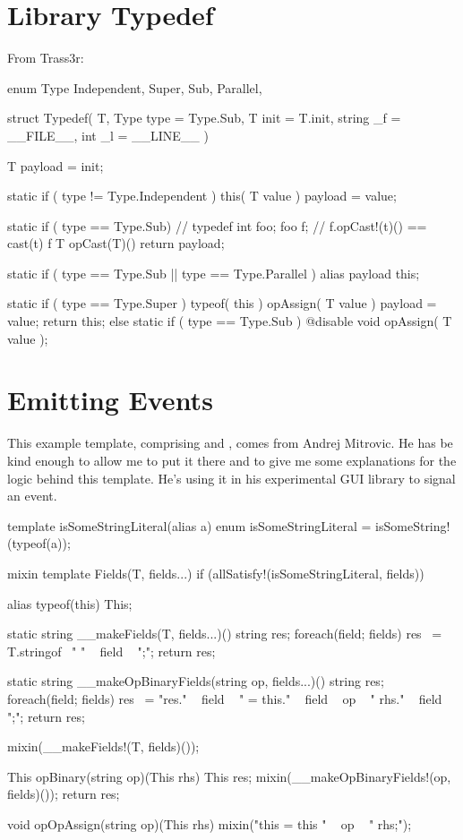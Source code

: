 \section{Library Typedef}

From Trass3r:

\begin{dcode}
enum Type
{
    Independent,
    Super,
    Sub,
    Parallel,
}

struct Typedef( T, 
                Type type = Type.Sub, 
                T init = T.init, 
                string _f = __FILE__,
                int _l = __LINE__ )
{
    T payload = init;

    static if ( type != Type.Independent )
        this( T value )
        {
            payload = value;
        }

    static if ( type == Type.Sub)
        // typedef int foo; foo f;
        // f.opCast!(t)() == cast(t) f
        T opCast(T)()
        {
            return payload;
        }

    static if ( type == Type.Sub || type == Type.Parallel )
        alias payload this;

    static if ( type == Type.Super )
        typeof( this ) opAssign( T value )
        {
            payload = value;
            return this;
        }
    else static if ( type == Type.Sub )
        @disable void opAssign( T value );
}
\end{dcode}

\section{Emitting Events}

This example template, comprising  and , comes from Andrej Mitrovic. He has be kind enough to allow me to put it there and to give me some explanations for the logic behind this template. He's using it in his experimental GUI library to signal an event.

\begin{dcode}
template isSomeStringLiteral(alias a)
{
    enum isSomeStringLiteral = isSomeString!(typeof(a));
}

mixin template Fields(T, fields...) 
    if (allSatisfy!(isSomeStringLiteral, fields))
{
    alias typeof(this) This;

    static string __makeFields(T, fields...)()
    {
        string res;
        foreach(field; fields) res ~= T.stringof~ " " ~ field ~ ";\n";
        return res;
    }

    static string __makeOpBinaryFields(string op, fields...)()
    {
        string res;
        foreach(field; fields) 
            res ~= "res." ~ field 
                 ~ " = this." ~ field ~ op ~ " rhs." ~ field ~ ";\n";
        return res;
    }

    mixin(__makeFields!(T, fields)());

    This opBinary(string op)(This rhs)
    {
        This res;
        mixin(__makeOpBinaryFields!(op, fields)());
        return res;
    }

    void opOpAssign(string op)(This rhs)
    {
        mixin("this = this " ~ op ~ " rhs;");
    }                
}
\end{dcode}

